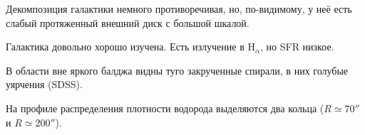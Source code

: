 \documentclass[english,10pt]{article}
\begin{document}
\bigskip
\noindent
Декомпозиция галактики немного противоречивая, но, по-видимому, 
у неё есть слабый протяженный внешний диск с большой шкалой.

\bigskip
\noindent
Галактика довольно хорошо изучена. Есть излучение в H$_\alpha$, 
но SFR низкое.

\bigskip
\noindent
В области вне яркого балджа видны туго закрученные спирали, в них 
голубые уярчения (SDSS). 

\bigskip
\noindent
На профиле распределения плотности водорода выделяются два кольца 
($R \simeq 70''$ и $R \simeq 200''$).
\end{document}
